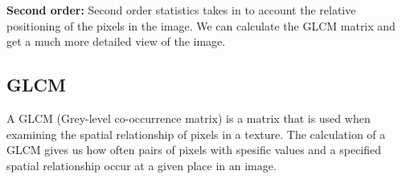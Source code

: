 	  \vspace{10px}
	  
	  \textbf{Second order:} Second order statistics takes in to account the relative positioning of the pixels in the image. We can calculate the GLCM matrix and get a much more detailed 
	  view of the image. \\
	  
	  
	  
	  \subsection{GLCM}
	    A GLCM (Grey-level co-occurrence matrix) is a matrix that is used when examining the spatial relationship of pixels in a texture. 
	    The calculation of a GLCM gives us how often pairs of pixels with spesific values and a specified spatial relationship occur at a given place in an image. %
	  
